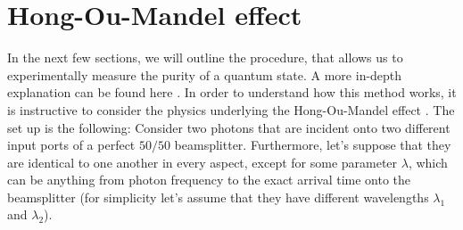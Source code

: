 \section{Hong-Ou-Mandel effect}
In the next few sections, we will outline the procedure, that allows us to experimentally measure the purity of a quantum state. A more in-depth explanation can be found here \cite{preiss thesis}. In order to understand how this method works, it is instructive to consider the physics underlying the Hong-Ou-Mandel effect \cite{HOM}. The set up is the following: Consider two photons that are incident onto two different input ports of a perfect $50/50$ beamsplitter. Furthermore, let's suppose that they are identical to one another in every aspect, except for some parameter $\lambda$, which can be anything from photon frequency to the exact arrival time onto the beamsplitter (for simplicity let's assume that they have different wavelengths $\lambda_1$ and $\lambda_2$).

